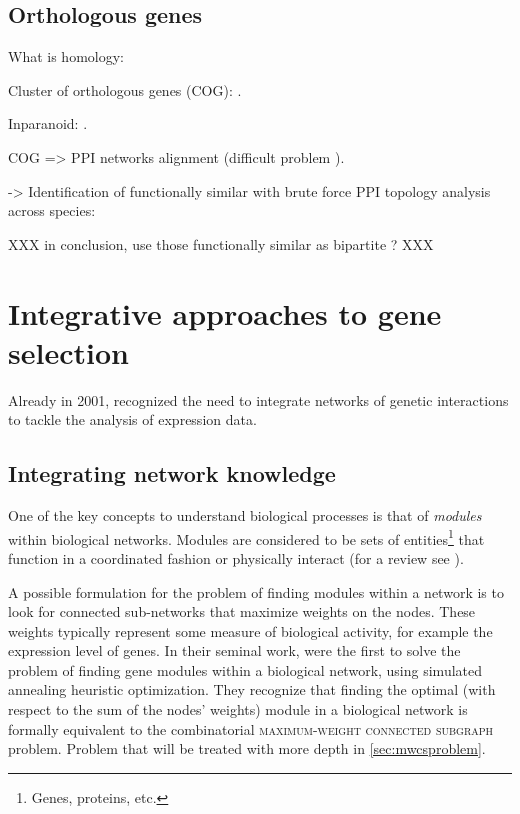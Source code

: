 	\subsection{Orthologous genes}

	What is homology: \parencite{mccune2012using}

	Cluster of orthologous genes (COG): \parencite{tatusov1997genomic}.
	
	Inparanoid: \parencite{obrien2005inparanoid}.

	COG => PPI networks alignment (difficult problem \parencite{el2011lagrangian}).

	-> Identification of functionally similar with brute force PPI topology analysis across species: \parencite{bandyopadhyay2006systematic}

	XXX in conclusion, use those functionally similar as bipartite ? XXX

\section{Integrative approaches to gene selection}

	Already in 2001, \textcite{altman2001whole} recognized the need to integrate networks of genetic interactions to tackle the analysis of expression data.

	\subsection{Integrating network knowledge}

		One of the key concepts to understand biological processes is that of \emph{modules} within biological networks.
		Modules are considered to be sets of entities\footnote{Genes, proteins, etc.} that function in a coordinated fashion or physically interact (for a review see \textcite{mitra2013integrative}).

		A possible formulation for the problem of finding modules within a network is to look for connected sub-networks that maximize weights on the nodes.
		These weights typically represent some measure of biological activity, for example the expression level of genes.
		In their seminal work, \textcite{ideker2002discovering} were the first to solve the problem of finding gene modules within a biological network, using simulated annealing heuristic optimization.
		They recognize that finding the optimal (with respect to the sum of the nodes' weights) module in a biological network is formally equivalent to the combinatorial \textsc{maximum-weight connected subgraph} problem.
		Problem that will be treated with more depth in \cref{sec:mwcsproblem}.

